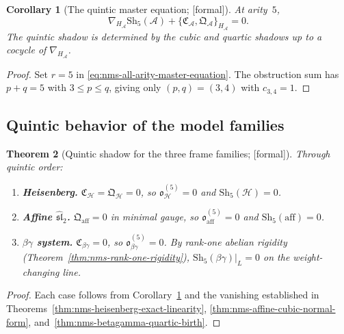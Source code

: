 \documentclass[11pt,oneside]{memoir}
\numberwithin{equation}{chapter}
\newtheorem{theorem}{Theorem}[chapter]
\newtheorem{corollary}[theorem]{Corollary}
\theoremstyle{definition}
\newcommand{\ClaimStatusProvedHere}{\textnormal{[formal]}}
\newcommand{\cA}{\mathcal A}
\begin{document}
\begin{corollary}[The quintic master equation; \ClaimStatusProvedHere]
\label{cor:nms-quintic-master-equation}
At arity~$5$,
\begin{equation}
\label{eq:nms-quintic-master-equation}
\nabla_{H_{\cA}}\mathrm{Sh}_5(\cA)
+
\{\mathfrak C_{\cA},\mathfrak Q_{\cA}\}_{H_{\cA}}
= 0.
\end{equation}
The quintic shadow is determined by the cubic and quartic shadows up to a cocycle of $\nabla_{H_{\cA}}$.
\end{corollary}

\begin{proof}
Set $r=5$ in \eqref{eq:nms-all-arity-master-equation}.  The obstruction sum has $p+q=5$ with $3\le p\le q$, giving only $(p,q)=(3,4)$ with $c_{3,4}=1$.\qedhere
\end{proof}

\subsection{Quintic behavior of the model families}
\label{subsec:nms-quintic-model-families}

\begin{theorem}[Quintic shadow for the three frame families; \ClaimStatusProvedHere]
\label{thm:nms-quintic-frame-families}
Through quintic order:
\begin{enumerate}[label=\textup{(\roman*)}]
\item \textbf{Heisenberg.}
$\mathfrak C_{\mathcal H}=\mathfrak Q_{\mathcal H}=0$, so $\mathfrak o_{\mathcal H}^{(5)}=0$ and $\mathrm{Sh}_5(\mathcal H)=0$.

\item \textbf{Affine $\widehat{\mathfrak{sl}}_2$.}
$\mathfrak Q_{\mathrm{aff}}=0$ in minimal gauge, so $\mathfrak o_{\mathrm{aff}}^{(5)}=0$ and $\mathrm{Sh}_5(\mathrm{aff})=0$.

\item \textbf{$\beta\gamma$ system.}
$\mathfrak C_{\beta\gamma}=0$, so $\mathfrak o_{\beta\gamma}^{(5)}=0$.  By rank-one abelian rigidity (Theorem~\ref{thm:nms-rank-one-rigidity}), $\mathrm{Sh}_5(\beta\gamma)|_L=0$ on the weight-changing line.
\end{enumerate}
\end{theorem}

\begin{proof}
Each case follows from Corollary~\ref{cor:nms-quintic-master-equation} and the vanishing established in Theorems~\ref{thm:nms-heisenberg-exact-linearity}, \ref{thm:nms-affine-cubic-normal-form}, and~\ref{thm:nms-betagamma-quartic-birth}.\qedhere
\end{proof}
\end{document}
